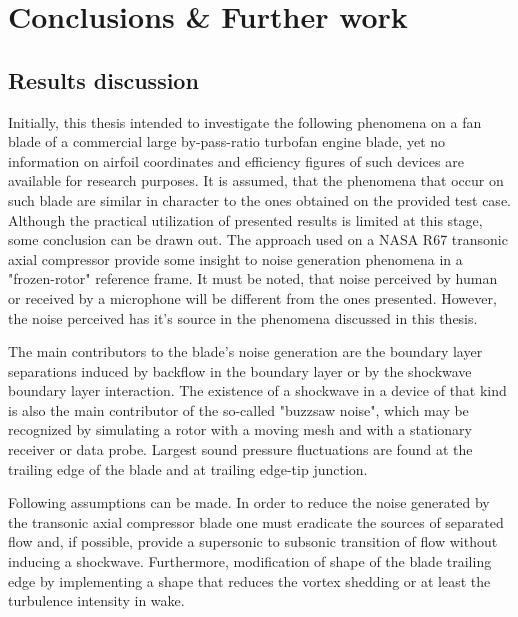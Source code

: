 
\chapter{Conclusions \& Further work} %

\label{conclusions} %


\section{Results discussion}
Initially, this thesis intended to investigate the following phenomena on a fan blade of a commercial large by-pass-ratio turbofan engine blade, yet no information on airfoil coordinates and efficiency figures of such devices are available for research purposes. It is assumed, that the phenomena that occur on such blade are similar in character to the ones obtained on the provided test case. Although the practical utilization of presented results is limited at this stage, some conclusion can be drawn out. The approach used on a NASA R67 transonic axial compressor provide some insight to noise generation phenomena in a "frozen-rotor" reference frame. It must be noted, that noise perceived by human or received by a microphone will be different from the ones presented. However, the noise perceived has it's source in the phenomena discussed in this thesis.

The main contributors to the blade's noise generation are the boundary layer separations induced by backflow in the boundary layer or by the shockwave boundary layer interaction. The existence of a shockwave in a device of that kind is also the main contributor of the so-called "buzzsaw noise", which may be recognized by simulating a rotor with a moving mesh and with a stationary receiver or data probe. Largest sound pressure fluctuations are found at the trailing edge of the blade and at trailing edge-tip junction.

Following assumptions can be made. In order to reduce the noise generated by the transonic axial compressor blade one must eradicate the sources of separated flow and, if possible, provide a supersonic to subsonic transition of flow without inducing a shockwave. Furthermore, modification of shape of the blade trailing edge by implementing a shape that reduces the vortex shedding or at least the turbulence intensity in wake.

